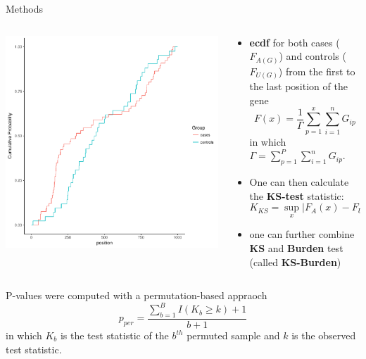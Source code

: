 \documentclass{beamer}
\begin{document}
  \begin{frame}[t]{Methods}
    \tiny
    \begin{columns}
      \begin{column}{0.5\textwidth}
        \includegraphics[width=0.9\linewidth]{plots/ks_example.pdf}
      \end{column}
      \begin{column}{0.5\textwidth}
        \begin{itemize}
          \item \textbf{ecdf} for both cases ($F_{A(G)}$) and controls ($F_{U(G)}$) from the first to the last position of the gene 
            \begin{equation}
              F(x) = \frac{1}{\Gamma} \sum^x_{p=1}\sum^n_{i=1}G_{ip}
            \end{equation}
            in which $\Gamma = \sum^P_{p=1}\sum^n_{i=1} G_{ip}$.
          \item One can then calculate the \textbf{KS-test} statistic:
            \begin{equation}
              K_{KS} = \sup_x | F_A(x) - F_U(x) |
            \end{equation}
          \item one can further combine \textbf{KS} and \textbf{Burden} test (called \textbf{KS-Burden})
        \end{itemize}
      \end{column}
    \end{columns}
    \begin{center}
      P-values were computed with a permutation-based appraoch
      \begin{equation}
        p_{per} = \frac{\sum^B_{b=1} I(K_b \geq k)+1}{b+1}
      \end{equation}
      in which $K_b$ is the test statistic of the $b^{th}$ permuted sample and $k$ is the observed test statistic.
    \end{center}
  \end{frame}
\end{document}
